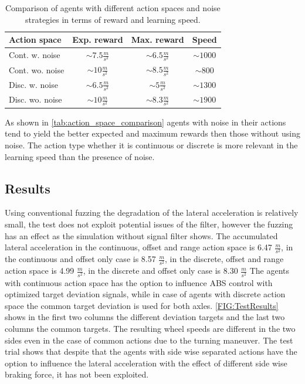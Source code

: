 \documentclass[a4paper, fleqn]{template/cas-dc}
\begin{document}
	\begin{table}[hb]
		\centering		
		\renewcommand{\arraystretch}{1.2} %
		\begin{tabular}{l|c|c|c}			
			Action space & Exp. reward & Max. reward & Speed \\
			\hline
			Cont. w. noise    & $\sim7.5\frac{m}{s^2}$  & $\sim6.5\frac{m}{s^2}$  & $\sim 1000$                \\
			Cont. wo. noise   & $\sim10\frac{m}{s^2}$   & $\sim8.5\frac{m}{s^2}$ & $\sim 800$                 \\
			Disc. w. noise    & $\sim6.5\frac{m}{s^2}$  & $\sim5\frac{m}{s^2}$   & $\sim 1300$                \\
			Disc. wo. noise   & $\sim10\frac{m}{s^2}$   & $\sim8.3\frac{m}{s^2}$ & $\sim 1900$                \\			
		\end{tabular}				
		\caption{Comparison of agents with different action spaces and noise strategies in terms of reward and learning speed.}
		\label{tab:action_space_comparison}
	\end{table}
		
	As shown in \autoref{tab:action_space_comparison} agents with noise in their actions tend to yield the better expected and maximum rewards then those without using noise. The action type whether it is continuous or discrete is more relevant in the learning speed than the presence of noise. 		
	
	\subsection{Results}
	Using conventional fuzzing the degradation of the lateral acceleration is relatively small, the test does not exploit potential issues of the filter, however the fuzzing has an effect as the simulation without signal filter shows. The accumulated lateral acceleration in the continuous, offset and range action space is 6.47 $\frac{m}{s^2}$, in the continuous and offset only case is 8.57 $\frac{m}{s^2}$, in the discrete, offset and range action space is 4.99 $\frac{m}{s^2}$, in the discrete and offset only case is 8.30 $\frac{m}{s^2}$ 
	The agents with continuous action space has the option to influence ABS control with optimized target deviation signals, while in case of agents with discrete action space the common target deviation is used for both axles. \autoref{FIG:TestResults} shows in the first two columns the different deviation targets and the last two columns the common targets. The resulting wheel speeds are different in the two sides even in the case of common actions due to the turning maneuver. The test trial shows that despite that the agents with side wise separated actions have the option to influence the lateral acceleration with the effect of different side wise braking force, it has not been exploited.
			
\end{document}
